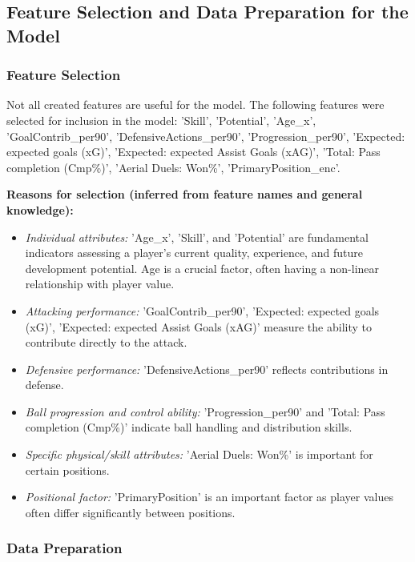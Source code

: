 \documentclass[12pt, a4paper]{report}
\begin{document}
\subsection{Feature Selection and Data Preparation for the Model}
\subsubsection{Feature Selection}

Not all created features are useful for the model. The following features were selected for inclusion in the model:
'Skill',
'Potential',
'Age\_x',
'GoalContrib\_per90',
'DefensiveActions\_per90',
'Progression\_per90',
'Expected: expected goals (xG)',
'Expected: expected Assist Goals (xAG)',
'Total: Pass completion (Cmp\%)',
'Aerial Duels: Won\%',
'PrimaryPosition\_enc'.

\textbf{Reasons for selection (inferred from feature names and general knowledge):}
\begin{itemize}
    \item \textit{Individual attributes:} 'Age\_x', 'Skill', and 'Potential' are fundamental indicators assessing a player's current quality, experience, and future development potential. Age is a crucial factor, often having a non-linear relationship with player value.
    \item \textit{Attacking performance:} 'GoalContrib\_per90', 'Expected: expected goals (xG)', 'Expected: expected Assist Goals (xAG)' measure the ability to contribute directly to the attack.
    \item \textit{Defensive performance:} 'DefensiveActions\_per90' reflects contributions in defense.
    \item \textit{Ball progression and control ability:} 'Progression\_per90' and 'Total: Pass completion (Cmp\%)' indicate ball handling and distribution skills.
    \item \textit{Specific physical/skill attributes:} 'Aerial Duels: Won\%' is important for certain positions.
    \item \textit{Positional factor:} 'PrimaryPosition' is an important factor as player values often differ significantly between positions.
\end{itemize}

\subsubsection{Data Preparation}
\end{document}
